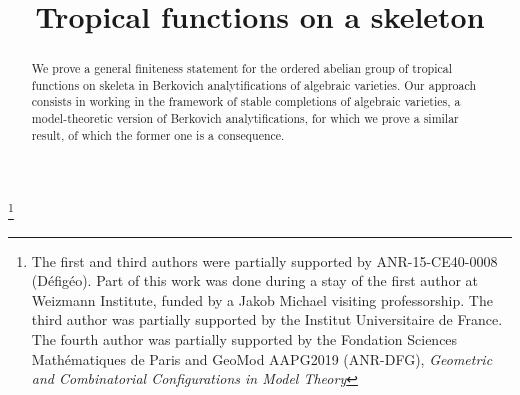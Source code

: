 \documentclass[JEP,XML,SOM,Unicode,ThmDefs,NoEqCountersInSection,published]{cedram}
\theoremstyle{plain}
\theoremstyle{definition}
\begin{document}
\frontmatter
\title{Tropical functions on a skeleton}

\author[\initial{A.} \lastname{Ducros}]{ }
\address{Sorbonne Université, Université Paris-Diderot, CNRS, Institut de Mathématiques de Jussieu-Paris
Rive Gauche,\\
Campus Pierre et Marie Curie, case 247, 4 place Jussieu, 75252 Paris cedex 5, France}

\author[\initial{E.} \lastname{Hrushovski}]{ }
\address{Mathematical Institute,
University of Oxford,
Andrew Wiles Building,\\
Radcliffe Observatory Quarter
Woodstock Road,
Oxford
OX2 6GG, UK}

\author[\initial{F.} \lastname{Loeser}]{ }
\address{Institut universitaire de France, Sorbonne Université, Institut de Mathématiques de Jussieu-Paris
Rive Gauche CNRS,\\
Campus Pierre et Marie Curie, case 247, 4 place Jussieu, 75252 Paris cedex 5, France}

\author[\initial{J.} \lastname{Ye}]{ }
\address{Mathematical Institute, University of Oxford, Andrew Wiles Building\\
Radcliffe Observatory Quarter Woodstock Road, Oxford OX2 6GG, UK}

\thanks{The first and third authors were partially supported by ANR-15-CE40-0008 (Défigéo).
Part of this work was done
during a stay of the first author at Weizmann Institute, funded by a Jakob Michael visiting professorship.
The third author was partially supported by the Institut Universitaire de France.
The fourth author was partially supported by the Fondation Sciences Mathématiques de Paris and GeoMod AAPG2019 (ANR-DFG), \textit{Geometric and
Combinatorial Configurations in Model Theory}}

\begin{abstract}
We prove a general finiteness statement for the ordered abelian group of tropical functions on skeleta in Berkovich analytifications of algebraic varieties. Our approach consists in working in the framework of stable completions of algebraic varieties, a model-theoretic version of Berkovich analytifications, for which we prove a similar result, of which the former one is a consequence.
\end{abstract}
\end{document}
